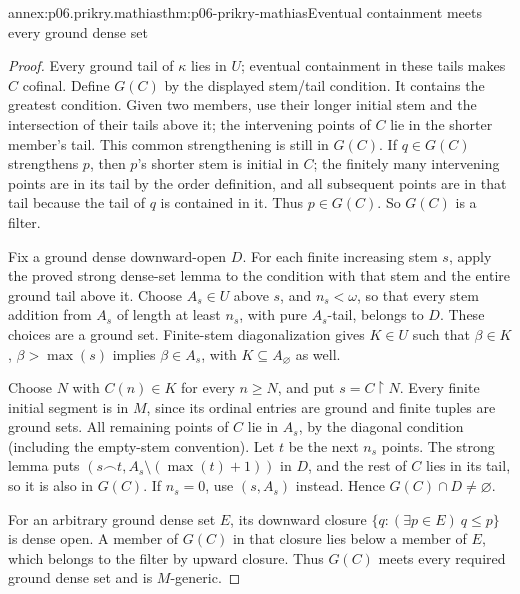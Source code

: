 \begin{annexitem}{annex:p06.prikry.mathias}{thm:p06-prikry-mathias}{Eventual containment meets every ground dense set}
\begin{proof}
Every ground tail of \(\kappa\) lies in \(U\); eventual containment
in these tails makes \(C\) cofinal. Define \(G(C)\) by the displayed
stem/tail condition. It contains the greatest condition. Given two
members, use their longer initial stem and the intersection of their
tails above it; the intervening points of \(C\) lie in the shorter
member's tail. This common strengthening is still in \(G(C)\).
If \(q\in G(C)\) strengthens \(p\), then \(p\)'s shorter stem
is initial in \(C\); the finitely many intervening points are in its
tail by the order definition, and all subsequent points are in that
tail because the tail of \(q\) is contained in it. Thus \(p\in G(C)\).
So \(G(C)\) is a filter.

Fix a ground dense downward-open \(D\). For each finite increasing
stem \(s\), apply the proved strong dense-set lemma to the condition
with that stem and the entire ground tail above it. Choose
\(A_s\in U\) above \(s\), and \(n_s<\omega\), so that every
stem addition from \(A_s\) of length at least \(n_s\), with pure
\(A_s\)-tail, belongs to \(D\). These choices are a ground set.
Finite-stem diagonalization gives \(K\in U\) such that
\(\beta\in K\), \(\beta>\max(s)\) implies \(\beta\in A_s\),
with \(K\subseteq A_{\varnothing}\) as well.

Choose \(N\) with \(C(n)\in K\) for every \(n\geq N\), and put
\(s=C\mathbin{\upharpoonright}N\). Every finite initial segment is
in \(M\), since its ordinal entries are ground and finite tuples are
ground sets. All remaining points of \(C\) lie in \(A_s\), by the
diagonal condition (including the empty-stem convention). Let \(t\)
be the next \(n_s\) points. The strong lemma puts
\((s\mathbin{\frown}t,A_s\setminus(\max(t)+1))\) in \(D\), and
the rest of \(C\) lies in its tail, so it is also in \(G(C)\).
If \(n_s=0\), use \((s,A_s)\) instead. Hence \(G(C)\cap D\ne\varnothing\).

For an arbitrary ground dense set \(E\), its downward closure
\(\{q:(\exists p\in E)\ q\leq p\}\) is dense open. A member of
\(G(C)\) in that closure lies below a member of \(E\), which belongs
to the filter by upward closure. Thus \(G(C)\) meets every required
ground dense set and is \(M\)-generic.
\end{proof}
\end{annexitem}
